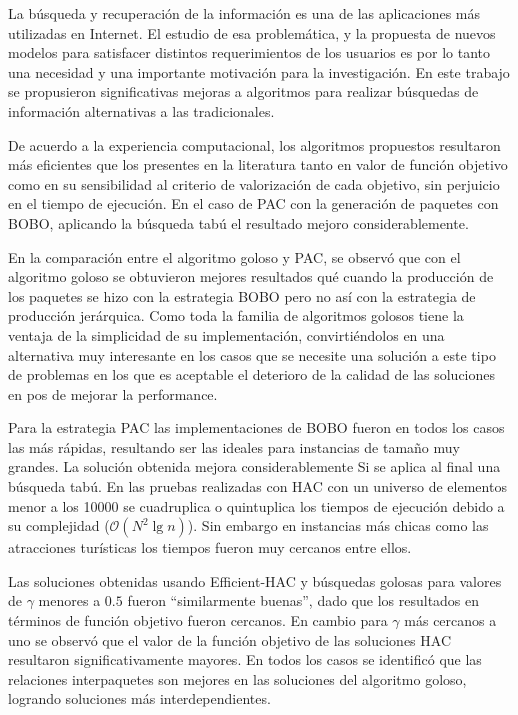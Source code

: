 La búsqueda y recuperación de la información es una de las aplicaciones más utilizadas en Internet. El estudio de esa problemática, y la propuesta de nuevos modelos para satisfacer distintos requerimientos de los usuarios es por lo tanto una necesidad y una importante motivación para la investigación. En este trabajo se propusieron significativas mejoras a algoritmos para realizar búsquedas de información alternativas a las tradicionales.

De acuerdo a la experiencia computacional, los algoritmos propuestos resultaron más eficientes que los presentes en la literatura tanto en valor de función objetivo como en su sensibilidad al criterio de valorización de cada objetivo, sin perjuicio en el tiempo de ejecución. En el caso de PAC con la generación de paquetes con BOBO, aplicando la búsqueda tabú el resultado mejoro considerablemente.

En la comparación entre el algoritmo goloso y PAC, se observó que con el algoritmo goloso se obtuvieron mejores resultados qué cuando la producción de los paquetes se hizo con la estrategia BOBO pero no así con la estrategia de producción jerárquica. Como toda la familia de algoritmos golosos tiene la ventaja de la simplicidad de su implementación, convirtiéndolos en una alternativa muy interesante en los casos que se necesite una solución a este tipo de problemas en los que es aceptable el deterioro de la calidad de las soluciones en pos de mejorar la performance.

Para la estrategia PAC las implementaciones de BOBO fueron en todos los casos las más rápidas, resultando ser las ideales para instancias de tamaño muy grandes. La solución obtenida mejora considerablemente Si se aplica al final una búsqueda tabú. En las pruebas realizadas con HAC con un universo de elementos menor a los 10000 se cuadruplica o quintuplica los tiempos de ejecución debido a su complejidad ($\mathcal{O}(N^{2}\lg n)$). Sin embargo en instancias más chicas como las atracciones turísticas los tiempos fueron muy cercanos entre ellos.

Las soluciones obtenidas usando Efficient-HAC y búsquedas golosas para valores de $\gamma$ menores a $0.5$ fueron \textquotedblleft similarmente buenas\textquotedblright , dado que los resultados en términos de función objetivo fueron cercanos. En cambio para $\gamma$ más cercanos a uno se observó que el valor de la función objetivo de las soluciones HAC resultaron significativamente mayores. En todos los casos se identificó que las relaciones interpaquetes son mejores en las soluciones del algoritmo goloso, logrando soluciones más interdependientes.

